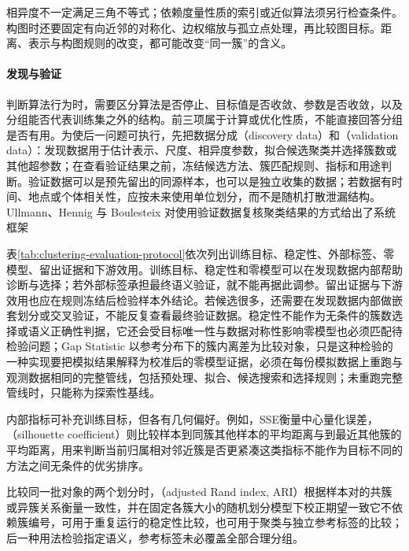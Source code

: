相异度不一定满足三角不等式；依赖度量性质的索引或近似算法须另行检查条件。构图时还要固定有向近邻的对称化、边权缩放与孤立点处理，再比较图目标。距离、表示与构图规则的改变，都可能改变“同一簇”的含义。

\paragraph{发现与验证}
判断算法行为时，需要区分算法是否停止、目标值是否收敛、参数是否收敛，以及分组能否代表训练集之外的结构。前三项属于计算或优化性质，不能直接回答分组是否有用。为使后一问题可执行，先把数据分成（discovery data）和（validation data）：发现数据用于估计表示、尺度、相异度参数，拟合候选聚类并选择簇数或其他超参数；在查看验证结果之前，冻结候选方法、簇匹配规则、指标和用途判断。验证数据可以是预先留出的同源样本，也可以是独立收集的数据；若数据有时间、地点或个体相关性，应按未来使用单位划分，而不是随机打散泄漏结构。Ullmann、Hennig 与 Boulesteix 对使用验证数据复核聚类结果的方式给出了系统框架

表\ref{tab:clustering-evaluation-protocol}依次列出训练目标、稳定性、外部标签、零模型、留出证据和下游效用。训练目标、稳定性和零模型可以在发现数据内部帮助诊断与选择；若外部标签承担最终语义验证，就不能再据此调参。留出证据与下游效用也应在规则冻结后检验样本外结论。若候选很多，还需要在发现数据内部做嵌套划分或交叉验证，不能反复查看最终验证数据。稳定性不能作为无条件的簇数选择或语义正确性判据，它还会受目标唯一性与数据对称性影响零模型也必须匹配待检验问题；Gap Statistic 以参考分布下的簇内离差为比较对象，只是这种检验的一种实现要把模拟结果解释为校准后的零模型证据，必须在每份模拟数据上重跑与观测数据相同的完整管线，包括预处理、拟合、候选搜索和选择规则；未重跑完整管线时，只能称为探索性基线。

内部指标可补充训练目标，但各有几何偏好。例如，SSE衡量中心量化误差，（silhouette coefficient）则比较样本到同簇其他样本的平均距离与到最近其他簇的平均距离，用来判断当前归属相对邻近簇是否更紧凑这类指标不能作为目标不同的方法之间无条件的优劣排序。

比较同一批对象的两个划分时，（adjusted Rand index, ARI）根据样本对的共簇或异簇关系衡量一致性，并在固定各簇大小的随机划分模型下校正期望一致它不依赖簇编号，可用于重复运行的稳定性比较，也可用于聚类与独立参考标签的比较；后一种用法检验指定语义，参考标签未必覆盖全部合理分组。

